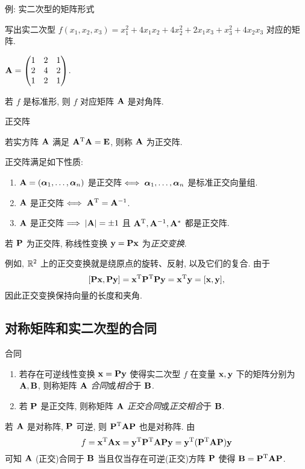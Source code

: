 \begin{frame}{例: 实二次型的矩阵形式}
	\onslide<+->
	\begin{example}
		写出实二次型 $f(x_1,x_2,x_3)=x_1^2+4x_1x_2+4x_2^2+2x_1x_3+x_3^2+4x_2x_3$ 对应的矩阵.
	\end{example}
	\onslide<+->
	\begin{solution}
		${\mathbf{A}}=\begin{pmatrix}
			1&2&1\\
			2&4&2\\
			1&2&1
		\end{pmatrix}$.
	\end{solution}
	\onslide<+->
	若 $f$ 是标准形, 则 $f$ 对应矩阵 ${\mathbf{A}}$ 是对角阵.
\end{frame}


\begin{frame}{正交阵}
	\onslide<+->
	\begin{definition}
		若实方阵 ${\mathbf{A}}$ 满足 ${\mathbf{A}}^{\mathrm{T}}{\mathbf{A}}={\mathbf{E}}$, 则称 ${\mathbf{A}}$ 为正交阵.
	\end{definition}
	\onslide<+->
	正交阵满足如下性质:
	\begin{enumerate}
		\item ${\mathbf{A}}=({\boldsymbol{\alpha}}_1,\dots,{\boldsymbol{\alpha}}_n)$ 是正交阵$\iff {\boldsymbol{\alpha}}_1,\dots,{\boldsymbol{\alpha}}_n$ 是标准正交向量组.
		\item ${\mathbf{A}}$ 是正交阵$\iff{\mathbf{A}}^{\mathrm{T}}={\mathbf{A}}^{-1}$.
		\item ${\mathbf{A}}$ 是正交阵$\implies|{\mathbf{A}}|=\pm1$ 且 ${\mathbf{A}}^{\mathrm{T}},{\mathbf{A}}^{-1},{\mathbf{A}}^*$ 都是正交阵.
	\end{enumerate}
	\onslide<+->
	\begin{definition}
		若 ${\mathbf{P}}$ 为正交阵, 称线性变换 ${\mathbf{y}}={\mathbf{P}}{\mathbf{x}}$ 为\emph{正交变换}.
	\end{definition}
	\onslide<+->
	例如, ${\mathbb{R}}^2$ 上的正交变换就是绕原点的旋转、反射, 以及它们的复合.
	\onslide<+->
	由于
	\[[{\mathbf{P}}{\mathbf{x}},{\mathbf{P}}{\mathbf{y}}]={\mathbf{x}}^{\mathrm{T}}{\mathbf{P}}^{\mathrm{T}}{\mathbf{P}}{\mathbf{y}}={\mathbf{x}}^{\mathrm{T}}{\mathbf{y}}=[{\mathbf{x}},{\mathbf{y}}],\]
	因此\alert{正交变换保持向量的长度和夹角}.
\end{frame}


\subsection{对称矩阵和实二次型的合同}
\begin{frame}{合同}
	\onslide<+->
	\begin{definition}
		\begin{enumerate}
			\item 若存在可逆线性变换 ${\mathbf{x}}={\mathbf{P}}{\mathbf{y}}$ 使得实二次型 $f$ 在变量 ${\mathbf{x}},{\mathbf{y}}$ 下的矩阵分别为 ${\mathbf{A}},{\mathbf{B}}$, 则称矩阵 ${\mathbf{A}}$ \emph{合同}或\emph{相合}于 ${\mathbf{B}}$.
			\item 若 ${\mathbf{P}}$ 是正交阵, 则称矩阵 ${\mathbf{A}}$ \emph{正交合同}或\emph{正交相合}于 ${\mathbf{B}}$.
		\end{enumerate}
	\end{definition}
	\onslide<+->
	若 ${\mathbf{A}}$ 是对称阵, ${\mathbf{P}}$ 可逆, 则 ${\mathbf{P}}^{\mathrm{T}}{\mathbf{A}}{\mathbf{P}}$ 也是对称阵.
	\onslide<+->
	由
	\[f={\mathbf{x}}^{\mathrm{T}}{\mathbf{A}}{\mathbf{x}}={\mathbf{y}}^{\mathrm{T}}{\mathbf{P}}^{\mathrm{T}}{\mathbf{A}}{\mathbf{P}}{\mathbf{y}}
	={\mathbf{y}}^{\mathrm{T}}({\mathbf{P}}^{\mathrm{T}}{\mathbf{A}}{\mathbf{P}}){\mathbf{y}}\]
	可知 ${\mathbf{A}}$ (正交)合同于 ${\mathbf{B}}$ 当且仅当存在可逆(正交)方阵 ${\mathbf{P}}$ 使得 ${\mathbf{B}}={\mathbf{P}}^{\mathrm{T}}{\mathbf{A}}{\mathbf{P}}$.
\end{frame}


